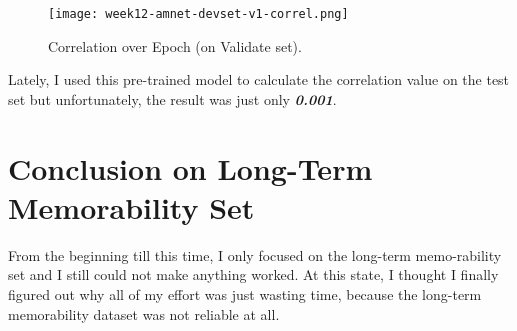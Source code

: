 \newpage
\begin{figure}[!ht]
\centering
\texttt{[image: week12-amnet-devset-v1-correl.png]}
\caption{Correlation over Epoch (on Validate set).}
\end{figure}

Lately, I used this pre-trained model to calculate the correlation value on the test set but unfortunately, the result was just only \textbf{\emph{0.001}}.


\section{Conclusion on Long-Term Memorability Set}
From the beginning till this time, I only focused on the long-term memo-rability set and I still could not make anything worked. At this state, I thought I finally figured out why all of my effort was just wasting time, because the long-term memorability dataset was not reliable at all.
